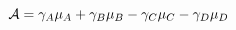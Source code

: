 \begin{equation}\label{eqn:reaction-affinity-chemical-potential}
\mathcal{A} ={{\gamma }_{A}}{{\mu }_{A}}+{{\gamma }_{B}}{{\mu }_{B}}-{{\gamma }_{C}}{{\mu }_{C}}-{{\gamma }_{D}}{{\mu }_{D}} \\

\end{equation}